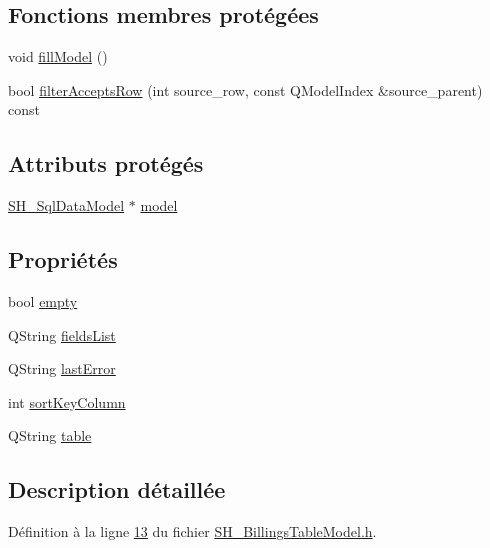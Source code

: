 \subsection*{Fonctions membres protégées}
\begin{DoxyCompactItemize}
\item 
void \hyperlink{classSH__BillingsTableModel_abb270d638314e98a5512c68c66bd88f1}{fill\-Model} ()
\item 
bool \hyperlink{classSH__ExtendedProxyModel_a1eda169699702a7bfed4dfa8718c0b86}{filter\-Accepts\-Row} (int source\-\_\-row, const Q\-Model\-Index \&source\-\_\-parent) const 
\end{DoxyCompactItemize}
\subsection*{Attributs protégés}
\begin{DoxyCompactItemize}
\item 
\hyperlink{classSH__SqlDataModel}{S\-H\-\_\-\-Sql\-Data\-Model} $\ast$ \hyperlink{classSH__ExtendedProxyModel_a8c8b8930c6b1abd9bbb1dce1fdc9690b}{model}
\end{DoxyCompactItemize}
\subsection*{Propriétés}
\begin{DoxyCompactItemize}
\item 
bool \hyperlink{classSH__ExtendedProxyModel_a9e22d17af7776aca8052084cc33c3442}{empty}
\item 
Q\-String \hyperlink{classSH__ExtendedProxyModel_a15e779ba92384a57442d6bd79ef3d1d1}{fields\-List}
\item 
Q\-String \hyperlink{classSH__ExtendedProxyModel_a287d34971582bbe68a7f1f0826165de5}{last\-Error}
\item 
int \hyperlink{classSH__ExtendedProxyModel_a47e2d0b99b84fb066438db667dd1ad26}{sort\-Key\-Column}
\item 
Q\-String \hyperlink{classSH__ExtendedProxyModel_a7eef4557a77444e9ce5c24c180392bfa}{table}
\end{DoxyCompactItemize}


\subsection{Description détaillée}


Définition à la ligne \hyperlink{SH__BillingsTableModel_8h_source_l00013}{13} du fichier \hyperlink{SH__BillingsTableModel_8h_source}{S\-H\-\_\-\-Billings\-Table\-Model.\-h}.



